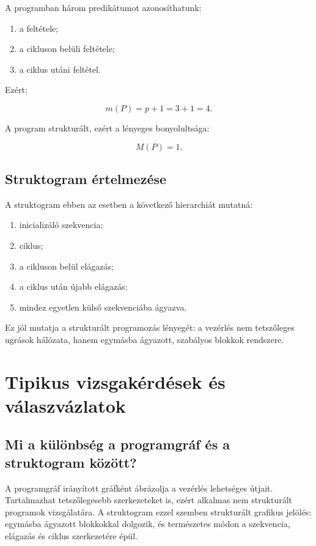 A programban három predikátumot azonosíthatunk:

\begin{enumerate}
  \item a  feltétele;
  \item a cikluson belüli  feltétele;
  \item a ciklus utáni  feltétel.
\end{enumerate}

Ezért:

\[
m(P)=p+1=3+1=4.
\]

A program strukturált, ezért a lényeges bonyolultsága:

\[
M(P)=1.
\]

\subsection{Struktogram értelmezése}

A struktogram ebben az esetben a következő hierarchiát mutatná:

\begin{enumerate}
  \item inicializáló szekvencia;
  \item ciklus;
  \item a cikluson belül elágazás;
  \item a ciklus után újabb elágazás;
  \item mindez egyetlen külső szekvenciába ágyazva.
\end{enumerate}

Ez jól mutatja a strukturált programozás lényegét: a vezérlés nem tetszőleges ugrások hálózata, hanem egymásba ágyazott, szabályos blokkok rendszere.

\section{Tipikus vizsgakérdések és válaszvázlatok}

\subsection{Mi a különbség a programgráf és a struktogram között?}

A programgráf irányított gráfként ábrázolja a vezérlés lehetséges útjait. Tartalmazhat tetszőlegesebb szerkezeteket is, ezért alkalmas nem strukturált programok vizsgálatára. A struktogram ezzel szemben strukturált grafikus jelölés: egymásba ágyazott blokkokkal dolgozik, és természetes módon a szekvencia, elágazás és ciklus szerkezetére épül.

